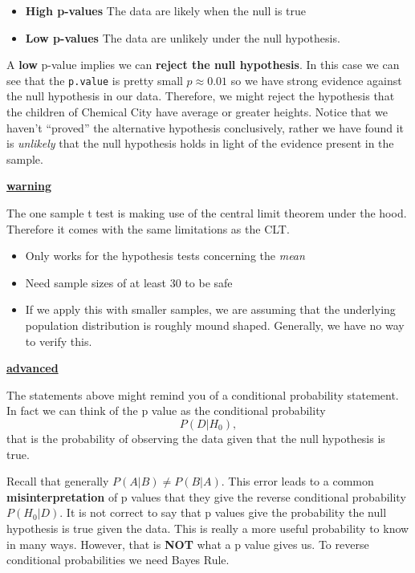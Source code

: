 \documentclass[
]{book}
\providecommand{\tightlist}{%
  \setlength{\itemsep}{0pt}\setlength{\parskip}{0pt}}
\newenvironment{rmdblock}[1]
  {\begin{shaded*}
  \centerline{\underline{\textbf{#1}}}

  }
  {
  \end{shaded*}
  }
\newenvironment{warning}
  {\begin{rmdblock}{warning}}
  {\end{rmdblock}}
\newenvironment{advanced}
  {\begin{rmdblock}{advanced}}
  {\end{rmdblock}}
\theoremstyle{definition}
\theoremstyle{definition}
\theoremstyle{definition}
\theoremstyle{definition}
\theoremstyle{remark}
\begin{document}
\begin{itemize}
\tightlist
\item
  \textbf{High p-values} The data are likely when the null is true
\item
  \textbf{Low p-values} The data are unlikely under the null hypothesis.
\end{itemize}

A \textbf{low} p-value implies we can \textbf{reject the null hypothesis}. In this case we can see that the \texttt{p.value} is pretty small \(p\approx0.01\) so we have strong evidence against the null hypothesis in our data. Therefore, we might reject the hypothesis that the children of Chemical City have average or greater heights. Notice that we haven't ``proved'' the alternative hypothesis conclusively, rather we have found it is \emph{unlikely} that the null hypothesis holds in light of the evidence present in the sample.

\begin{warning}
The one sample t test is making use of the central limit theorem under
the hood. Therefore it comes with the same limitations as the CLT.

\begin{itemize}
\tightlist
\item
  Only works for the hypothesis tests concerning the \emph{mean}
\item
  Need sample sizes of at least 30 to be safe
\item
  If we apply this with smaller samples, we are assuming that the
  underlying population distribution is roughly mound shaped. Generally,
  we have no way to verify this.
\end{itemize}
\end{warning}

\begin{advanced}
The statements above might remind you of a conditional probability statement. In fact we can think of the p value as the conditional probability \[P(D|H_0),\] that is the probability of observing the data given that the null hypothesis is true.

Recall that generally \(P(A|B)\neq P(B|A)\). This error leads to a common \textbf{misinterpretation} of p values that they give the reverse conditional probability \(P(H_0|D)\). It is not correct to say that p values give the probability the null hypothesis is true given the data. This is really a more useful probability to know in many ways. However, that is \textbf{NOT} what a p value gives us. To reverse conditional probabilities we need Bayes Rule.\\
\end{advanced}
\end{document}
